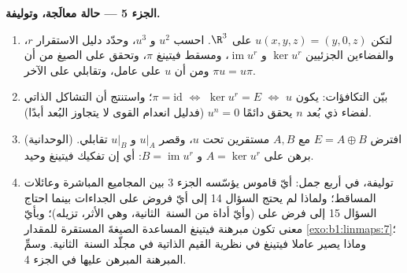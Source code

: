 \begin{problem}
\medskip
\noindent\textbf{الجزء 5 --- حالة معالَجة، وتوليفة.}
\begin{enumerate}[resume]
  \item لتكن $u(x, y, z) = (y, 0, z)$ على $\R^3$. احسب $u^2$ و
        $u^3$، وحدّد دليل الاستقرار $r$، والفضاءين
        الجزئيين $\ker u^{r}$ و $\operatorname{im} u^{r}$، ومسقط
        فيتينغ $\pi$، وتحقق على الصيغ من أن
        $\pi u = u\pi$ ومن أن $u$  على عامل،
        وتقابلي على الآخر.
  \item بيّن التكافؤات: يكون $u$  $\iff$ $\ker u^{r} =
        E$ $\iff$ $\pi = \mathrm{id}$؛ واستنتج أن
        التشاكل الذاتي  لفضاء ذي بُعد $n$
        يحقق دائمًا $u^{n} = 0$ (فدليل انعدام القوى لا
        يتجاوز البُعد أبدًا).
  \item (الوحدانية) افترض $E = A \oplus B$ مع $A, B$ مستقرين
        تحت $u$، وقصر $u|_A$  و $u|_B$
        تقابلي. برهن على $A = \ker u^{r}$ و $B =
        \operatorname{im} u^{r}$: أي إن تفكيك فيتينغ
        وحيد.
  \item توليفة، في أربع جمل: أيّ قاموس يؤسّسه الجزء 3
        بين المجاميع المباشرة وعائلات
        المساقط؛ ولماذا لم يحتج السؤال 14 إلى أيّ فروض على
        الجداءات بينما احتاج السؤال 15 إلى فرض على 
        (وأيّ أداة من السنة~الثانية، وهي الأثر، تزيله)؛ وبأيّ
        معنى تكون مبرهنة فيتينغ المساعدة الصيغةَ المستقرة للمقدار
        \cref{exo:b1:linmaps:7}؛ وماذا يصير عاملا
        فيتينغ في نظرية القيم الذاتية في مجلّد السنة~الثانية.
        وسمِّ المبرهنة المبرهن عليها في الجزء 4.
\end{enumerate}
\end{problem}
